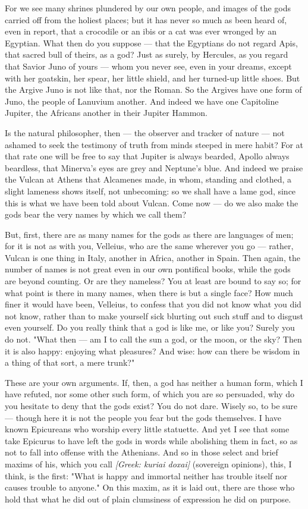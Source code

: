  For we see many shrines plundered by our own people, and images of the gods carried off from the holiest places; but it has never so much as been heard of, even in report, that a crocodile or an ibis or a cat was ever wronged by an Egyptian. What then do you suppose — that the Egyptians do not regard Apis, that sacred bull of theirs, as a god? Just as surely, by Hercules, as you regard that Savior Juno of yours — whom you never see, even in your dreams, except with her goatskin, her spear, her little shield, and her turned-up little shoes. But the Argive Juno is not like that, nor the Roman. So the Argives have one form of Juno, the people of Lanuvium another. And indeed we have one Capitoline Jupiter, the Africans another in their Jupiter Hammon.

 Is the natural philosopher, then — the observer and tracker of nature — not ashamed to seek the testimony of truth from minds steeped in mere habit? For at that rate one will be free to say that Jupiter is always bearded, Apollo always beardless, that Minerva's eyes are grey and Neptune's blue. And indeed we praise the Vulcan at Athens that Alcamenes made, in whom, standing and clothed, a slight lameness shows itself, not unbecoming: so we shall have a lame god, since this is what we have been told about Vulcan. Come now — do we also make the gods bear the very names by which we call them?

 But, first, there are as many names for the gods as there are languages of men; for it is not as with you, Velleius, who are the same wherever you go — rather, Vulcan is one thing in Italy, another in Africa, another in Spain. Then again, the number of names is not great even in our own pontifical books, while the gods are beyond counting. Or are they nameless? You at least are bound to say so; for what point is there in many names, when there is but a single face? How much finer it would have been, Velleius, to confess that you did not know what you did not know, rather than to make yourself sick blurting out such stuff and to disgust even yourself. Do you really think that a god is like me, or like you? Surely you do not. "What then — am I to call the sun a god, or the moon, or the sky? Then it is also happy: enjoying what pleasures? And wise: how can there be wisdom in a thing of that sort, a mere trunk?"

 These are your own arguments. If, then, a god has neither a human form, which I have refuted, nor some other such form, of which you are so persuaded, why do you hesitate to deny that the gods exist? You do not dare. Wisely so, to be sure — though here it is not the people you fear but the gods themselves. I have known Epicureans who worship every little statuette. And yet I see that some take Epicurus to have left the gods in words while abolishing them in fact, so as not to fall into offense with the Athenians. And so in those select and brief maxims of his, which you call \textit{[Greek: kuriai doxai]} (sovereign opinions), this, I think, is the first: "What is happy and immortal neither has trouble itself nor causes trouble to anyone." On this maxim, as it is laid out, there are those who hold that what he did out of plain clumsiness of expression he did on purpose.

